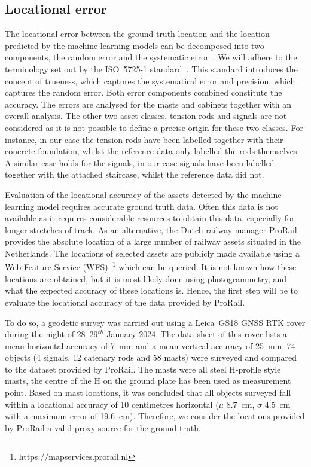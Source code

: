 \subsection{Locational error}\label{sec:objdet:obserr}
The locational error between the ground truth location and the location predicted by the machine learning models can be decomposed into two components, the random error and the systematic error~\cite{regtien}. We will adhere to the terminology set out by the ISO~5725-1 standard~\cite{iso5725}. This standard introduces the concept of trueness, which captures the systematical error and precision, which captures the random error. Both error components combined constitute the accuracy. The errors are analysed for the masts and cabinets together with an overall analysis. The other two asset classes, tension rods and signals are not considered as it is not possible to define a precise origin for these two classes. For instance, in our case the tension rods have been labelled together with their concrete foundation, whilst the reference data only labelled the rods themselves. A similar case holds for the signals, in our case signals have been labelled together with the attached staircase, whilst the reference data did not.

Evaluation of the locational accuracy of the assets detected by the machine learning model requires accurate ground truth data. Often this data is not available as it requires considerable resources to obtain this data, especially for longer stretches of track. As an alternative, the Dutch railway manager ProRail provides the absolute location of a large number of railway assets situated in the Netherlands. The locations of selected assets are publicly made available using a Web Feature Service (WFS)~\footnote{https://mapservices.prorail.nl} which can be queried. It is not known how these locations are obtained, but it is most likely done using photogrammetry, and what the expected accuracy of these locations is. Hence, the first step will be to evaluate the locational accuracy of the data provided by ProRail.

To do so, a geodetic survey was carried out using a Leica~GS18 GNSS RTK rover during the night of 28--29$^{th}$ January 2024. The data sheet of this rover lists a mean horizontal accuracy of 7~mm and a mean vertical accuracy of 25~mm. 74 objects (4 signals, 12 catenary rods and 58 masts) were surveyed and compared to the dataset provided by ProRail. The masts were all steel H-profile style masts, the centre of the H on the ground plate has been used as measurement point. Based on mast locations, it was concluded that all objects surveyed fall within a locational accuracy of 10 centimetres horizontal ($\mu$ 8.7~cm, $\sigma$ 4.5~cm with a maximum error of 19.6~cm). Therefore, we consider the locations provided by ProRail a valid proxy source for the ground truth.

